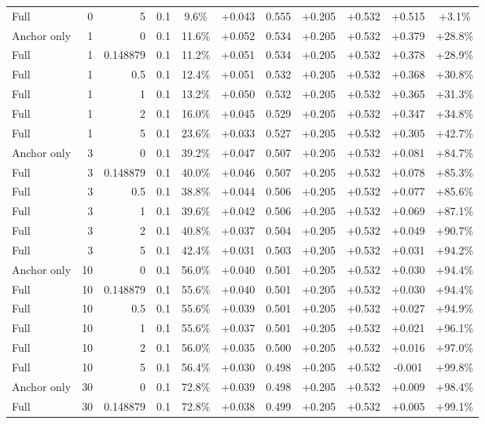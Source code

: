 \begin{table}[htbp]
\begin{tabular}{lrrrccccccc}
Full & 0 & 5 & 0.1 & 9.6\% & +0.043 & 0.555 & +0.205 & +0.532 & +0.515 & +3.1\% \\
Anchor only & 1 & 0 & 0.1 & 11.6\% & +0.052 & 0.534 & +0.205 & +0.532 & +0.379 & +28.8\% \\
Full & 1 & 0.148879 & 0.1 & 11.2\% & +0.051 & 0.534 & +0.205 & +0.532 & +0.378 & +28.9\% \\
Full & 1 & 0.5 & 0.1 & 12.4\% & +0.051 & 0.532 & +0.205 & +0.532 & +0.368 & +30.8\% \\
Full & 1 & 1 & 0.1 & 13.2\% & +0.050 & 0.532 & +0.205 & +0.532 & +0.365 & +31.3\% \\
Full & 1 & 2 & 0.1 & 16.0\% & +0.045 & 0.529 & +0.205 & +0.532 & +0.347 & +34.8\% \\
Full & 1 & 5 & 0.1 & 23.6\% & +0.033 & 0.527 & +0.205 & +0.532 & +0.305 & +42.7\% \\
Anchor only & 3 & 0 & 0.1 & 39.2\% & +0.047 & 0.507 & +0.205 & +0.532 & +0.081 & +84.7\% \\
Full & 3 & 0.148879 & 0.1 & 40.0\% & +0.046 & 0.507 & +0.205 & +0.532 & +0.078 & +85.3\% \\
Full & 3 & 0.5 & 0.1 & 38.8\% & +0.044 & 0.506 & +0.205 & +0.532 & +0.077 & +85.6\% \\
Full & 3 & 1 & 0.1 & 39.6\% & +0.042 & 0.506 & +0.205 & +0.532 & +0.069 & +87.1\% \\
Full & 3 & 2 & 0.1 & 40.8\% & +0.037 & 0.504 & +0.205 & +0.532 & +0.049 & +90.7\% \\
Full & 3 & 5 & 0.1 & 42.4\% & +0.031 & 0.503 & +0.205 & +0.532 & +0.031 & +94.2\% \\
Anchor only & 10 & 0 & 0.1 & 56.0\% & +0.040 & 0.501 & +0.205 & +0.532 & +0.030 & +94.4\% \\
Full & 10 & 0.148879 & 0.1 & 55.6\% & +0.040 & 0.501 & +0.205 & +0.532 & +0.030 & +94.4\% \\
Full & 10 & 0.5 & 0.1 & 55.6\% & +0.039 & 0.501 & +0.205 & +0.532 & +0.027 & +94.9\% \\
Full & 10 & 1 & 0.1 & 55.6\% & +0.037 & 0.501 & +0.205 & +0.532 & +0.021 & +96.1\% \\
Full & 10 & 2 & 0.1 & 56.0\% & +0.035 & 0.500 & +0.205 & +0.532 & +0.016 & +97.0\% \\
Full & 10 & 5 & 0.1 & 56.4\% & +0.030 & 0.498 & +0.205 & +0.532 & -0.001 & +99.8\% \\
Anchor only & 30 & 0 & 0.1 & 72.8\% & +0.039 & 0.498 & +0.205 & +0.532 & +0.009 & +98.4\% \\
Full & 30 & 0.148879 & 0.1 & 72.8\% & +0.038 & 0.499 & +0.205 & +0.532 & +0.005 & +99.1\% \\

\end{tabular}
\end{table}
